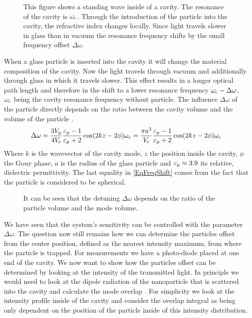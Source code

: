 \begin{figure}[H]
	
	\caption{This figure shows a standing wave inside of a cavity. The resonance of the cavity is $\de{\omega}{c}$. Through the introduction of the particle into the cavity, the refractive index changes locally. Since light travels slower in glass than in vacuum the resonance frequency shifts by the small frequency offset $\Delta\omega$.}
	\label{fig:CavityDetection}
\end{figure}

When a glass particle is inserted into the cavity it will change the material composition of the cavity. Now the light travels through vacuum and additionally through glass in which it travels slower. This effect results in a longer optical path length and therefore in the shift to a lower resonance frequency $\de{\omega}{c}-\Delta\omega$, $\de{\omega}{c}$ being the cavity resonance frequency without particle. The influence $\Delta\omega$ of the particle directly depends on the ratio between the cavity volume and the volume of the particle \cite{chang2010cavity}.
\begin{equation}\label{EqFreqShift}
	\Delta\omega=\frac{3\de{V}{p}}{4\de{V}{c}}\frac{\de{\varepsilon}{p}-1}{\de{\varepsilon}{p}+2}\cos(2kz-2\phi)\de{\omega}{c}=\frac{\pi a^3}{\de{V}{c}}\frac{\de{\varepsilon}{p}-1}{\de{\varepsilon}{p}+2}\cos(2kz-2\phi)\de{\omega}{c}
\end{equation}
Where $k$ is the wavevector of the cavity mode, $z$ the position inside the cavity, $\phi$ the Gouy phase, $a$ is the radius of the glass particle and $\de{\varepsilon}{p}\approx 3.9$ its relative, dielectric permittivity. The last equality in \autoref{EqFreqShift} comes from the fact that the particle is considered to be spherical.

\begin{figure}[H]
	
	\caption{It can be seen that the detuning $\Delta\omega$ depends on the ratio of the particle volume and the mode volume.}
	\label{fig:FreqShift}
\end{figure}

We have seen that the system's sensitivity can be controlled with the parameter $\Delta\omega$. The question now still remains how we can determine the particles offset from the center position, defined as the nearest intensity maximum, from where the particle is trapped. For measurements we have a photo-diode placed at one end of the cavity. We now want to show how the particles offset can be determined by looking at the intensity of the transmitted light. In principle we would need to look at the dipole radiation of the nanoparticle that is scattered into the cavity and calculate the mode overlap \cite{chang2010cavity}. For simplicity we look at the intensity profile inside of the cavity and consider the overlap integral as being only dependent on the position of the particle inside of this intensity distribution.

